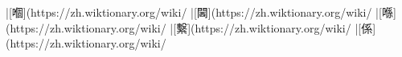 |[嗰](https://zh.wiktionary.org/wiki/%
|[閪](https://zh.wiktionary.org/wiki/%
|[喺](https://zh.wiktionary.org/wiki/%
|[繫](https://zh.wiktionary.org/wiki/%
|[係](https://zh.wiktionary.org/wiki/%
